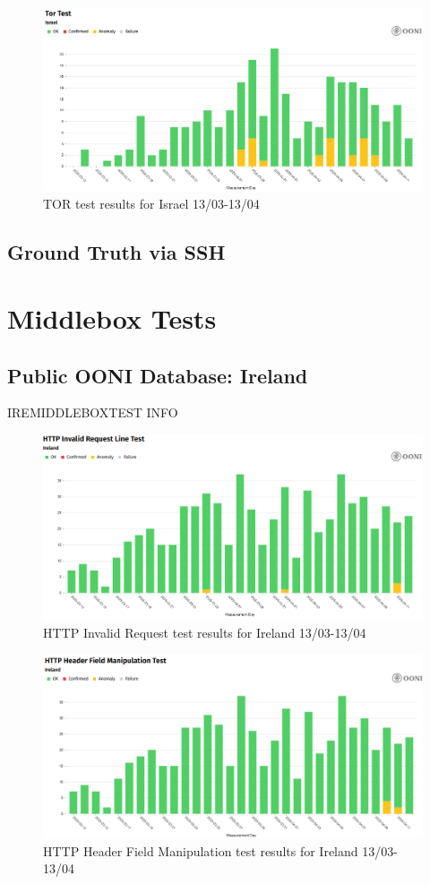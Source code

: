 \begin{figure} [H]
    \centering
    \includegraphics[width=0.5\linewidth]{ISROONITOR.png}
    \caption{TOR test results for Israel 13/03-13/04}
    \label{fig:enter-label}
\end{figure}

\subsection{Ground Truth via SSH}

\section{Middlebox Tests}
\subsection{Public OONI Database: Ireland}
IREMIDDLEBOXTEST INFO


\begin{figure} [H]
    \centering
    \includegraphics[width=0.5\linewidth]{IREOONIDBMB1.png}
    \caption{HTTP Invalid Request test results for Ireland 13/03-13/04}
    \label{fig:enter-label}
\end{figure}

\begin{figure} [H]
    \centering
    \includegraphics[width=0.5\linewidth]{IREOONIDBMB2.png}
    \caption{HTTP Header Field Manipulation test results for Ireland 13/03-13/04}
    \label{fig:enter-label}
\end{figure}


